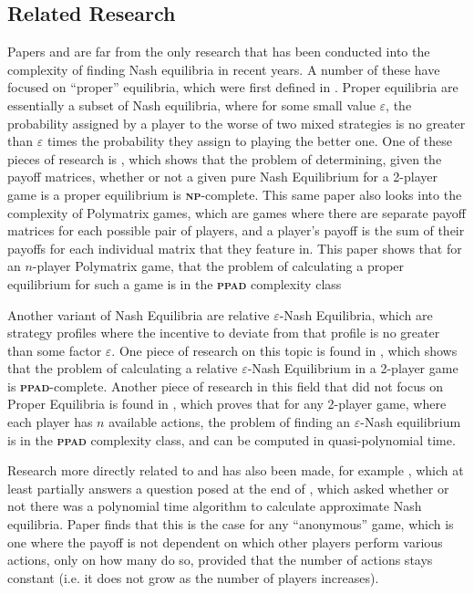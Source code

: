 \documentclass{article}
\begin{document}
\begin{multicols}{2}
\section{Related Research}
Papers \cite{Daskalakis.2009} and \cite{Fabrikant.2004} are far from the only research that has been conducted into the complexity of finding Nash equilibria in recent years. A number of these have focused on ``proper'' equilibria, which were first defined in \cite{MyersonR.B..1978}. Proper equilibria are essentially a subset of Nash equilibria, where for some small value $\varepsilon$, the probability assigned by a player to the worse of two mixed strategies is no greater than $\varepsilon$ times the probability they assign to playing the better one. One of these pieces of research is \cite{HansenKristofferArnsfelt.2018}, which shows that the problem of determining, given the payoff matrices, whether or not a given pure Nash Equilibrium for a 2-player game is a proper equilibrium is \textbf{\textsc{np}}-complete. This same paper also looks into the complexity of Polymatrix games, which are games where there are separate payoff matrices for each possible pair of players, and a player's payoff is the sum of their payoffs for each individual matrix that they feature in. This paper shows that for an $n$-player Polymatrix game, that the problem of calculating a proper equilibrium for such a game is in the \textbf{\textsc{ppad}} complexity class

Another variant of Nash Equilibria are relative $\varepsilon$-Nash Equilibria, which are strategy profiles where the incentive to deviate from that profile is no greater than some factor $\varepsilon$. One piece of research on this topic is found in \cite{Daskalakis.2013}, which shows that the problem of calculating a relative $\varepsilon$-Nash Equilibrium in a 2-player game is \textbf{\textsc{ppad}}-complete. Another piece of research in this field that did not focus on Proper Equilibria is found in \cite{rubinstein2016settling}, which proves that for any 2-player game, where each player has $n$ available actions, the problem of finding an $\varepsilon$-Nash equilibrium is in the \textbf{\textsc{ppad}} complexity class, and can be computed in quasi-polynomial time.

Research more directly related to \cite{Daskalakis.2009} and \cite{Fabrikant.2004} has also been made, for example \cite{Daskalakis.2015}, which at least partially answers a question posed at the end of \cite{Daskalakis.2009}, which asked whether or not there was a polynomial time algorithm to calculate approximate Nash equilibria. Paper \cite{Daskalakis.2015} finds that this is the case for any ``anonymous'' game, which is one where the payoff is not dependent on which other players perform various actions, only on how many do so, provided that the number of actions stays constant (i.e. it does not grow as the number of players increases).


\end{multicols}
\end{document}
